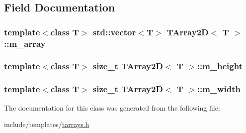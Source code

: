 \subsection{Field Documentation}
\hypertarget{classTArray2D_a81bcaaa46567b92d0bd375f32089cbef}{
\subsubsection[{m\_\-array}]{\setlength{\rightskip}{0pt plus 5cm}template$<$class T$>$ std::vector$<$T$>$ {\bf TArray2D}$<$ T $>$::{\bf m\_\-array}}}
\label{classTArray2D_a81bcaaa46567b92d0bd375f32089cbef}
\hypertarget{classTArray2D_a13bed626ce881556d57b34cf20951486}{
\subsubsection[{m\_\-height}]{\setlength{\rightskip}{0pt plus 5cm}template$<$class T$>$ size\_\-t {\bf TArray2D}$<$ T $>$::{\bf m\_\-height}}}
\label{classTArray2D_a13bed626ce881556d57b34cf20951486}
\hypertarget{classTArray2D_a9e3512ab08536241799945098c9c12cf}{
\subsubsection[{m\_\-width}]{\setlength{\rightskip}{0pt plus 5cm}template$<$class T$>$ size\_\-t {\bf TArray2D}$<$ T $>$::{\bf m\_\-width}}}
\label{classTArray2D_a9e3512ab08536241799945098c9c12cf}


The documentation for this class was generated from the following file:\begin{DoxyCompactItemize}
\item 
include/templates/\hyperlink{tarrays_8h}{tarrays.h}\end{DoxyCompactItemize}
